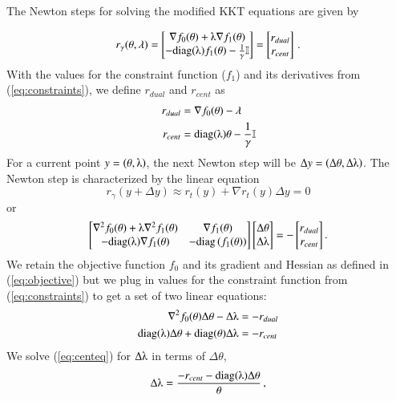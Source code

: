 \documentclass[11pt]{article}
\begin{document}
The Newton steps for solving the modified KKT equations are given by 

\[r_\gamma(\theta, \lambda) = \begin{bmatrix}
\nabla f_0(\theta) + \lambdaup\nabla f_1(\theta)\\
-\text{diag}(\lambdaup)f_1(\theta) - \frac{1}{\gamma}\mathbb{I}
\end{bmatrix} = \begin{bmatrix}
r_{dual}\\r_{cent}
\end{bmatrix}\,.\]
With the values for the constraint function ($f_1$) and its derivatives from (\ref{eq:constraints}), we define  $r_{dual}$ and $r_{cent}$ as 
\begin{align}
r_{dual}&= \nabla f_0(\theta) - \lambda\label{eq:rdual}\\
r_{cent}&= \text{diag}(\lambdaup)\theta - \frac{1}{\gamma}\mathbb{I}
\end{align}
For a current point $y = \left(\theta, \lambdaup\right)$, the next Newton step will be $\Delta y = \left(\Delta\theta, \Delta\lambdaup\right)$. The Newton step is characterized by the linear equation
\[r_\gamma(y + \Delta y) \approx r_t(y) + \nabla r_t(y)\Delta y = 0\] or 
\[\begin{bmatrix}
\nabla^2f_0(\theta) + \lambdaup\nabla^2f_1(\theta)&\nabla f_1(\theta)\\
-\text{diag}(\lambdaup)\nabla f_1(\theta)&-\text{diag}\left(f_1(\theta)\right)
\end{bmatrix}\begin{bmatrix}
\Delta\theta \\ \Delta\lambdaup
\end{bmatrix} = - \begin{bmatrix}
r_{dual}\\r_{cent}
\end{bmatrix}.\]
We retain the objective function $f_0$ and its gradient and Hessian as defined in (\ref{eq:objective}) but we plug in values for the constraint function from (\ref{eq:constraints}) to get a set of two linear equations:
\begin{align}
\nabla^2f_0(\theta)\Delta\theta - \Delta\lambdaup &= -r_{dual}\label{eq:dualeq}\\
\text{diag}(\lambdaup)\Delta\theta + \text{diag}(\theta)\Delta\lambdaup &= -r_{cent}\,\label{eq:centeq}
\end{align}
We solve (\ref{eq:centeq}) for $\Delta\lambdaup$ in terms of $\Delta\theta$,
\begin{equation}
\Delta\lambdaup = \frac{-r_{cent} - \text{diag}(\lambdaup)\Delta\theta}{\theta}\, ,\label{eq:dellam}
\end{equation}
\end{document}

